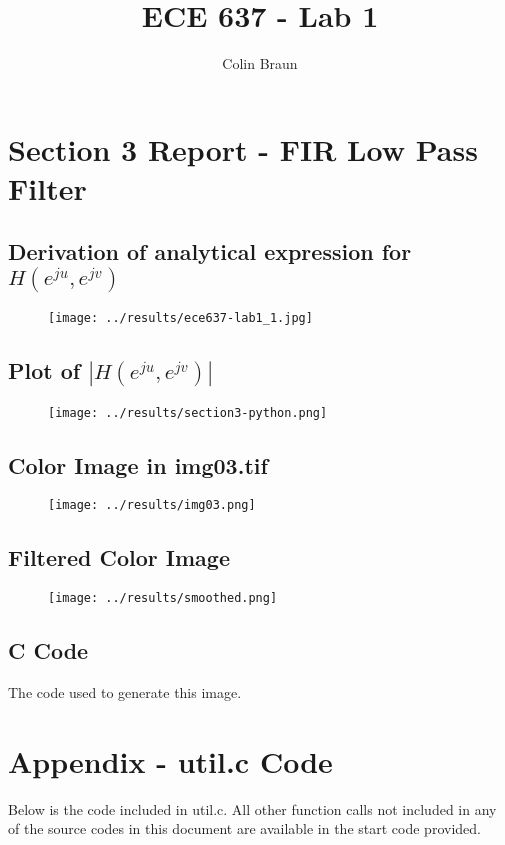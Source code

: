 \documentclass{article}
\title{ECE 637 - Lab 1}
\author{Colin Braun}
\begin{document}
\maketitle

\section{Section 3 Report - FIR Low Pass Filter}
\subsection{Derivation of analytical expression for $H(e^{ju}, e^{jv})$}
\begin{figure}[H]
    \centering
    \texttt{[image: ../results/ece637-lab1\_1.jpg]}
    \begin{center}
    \end{center}
\end{figure}
\subsection{Plot of $|H(e^{ju}, e^{jv})|$}
\begin{figure}[H]
    \centering
    \texttt{[image: ../results/section3-python.png]}
    \begin{center}
    \end{center}
\end{figure}
\subsection{Color Image in img03.tif}
\begin{figure}[H]
    \centering
    \texttt{[image: ../results/img03.png]}
    \begin{center}
    \end{center}
\end{figure}
\subsection{Filtered Color Image}
\begin{figure}[H]
    \centering
    \texttt{[image: ../results/smoothed.png]}
    \begin{center}
    \end{center}
\end{figure}
\subsection{C Code}
The code used to generate this image.



\section{Appendix - util.c Code}
Below is the code included in util.c. All other function calls not included in any of the source codes in this document are available in the start code provided.

\end{document}
